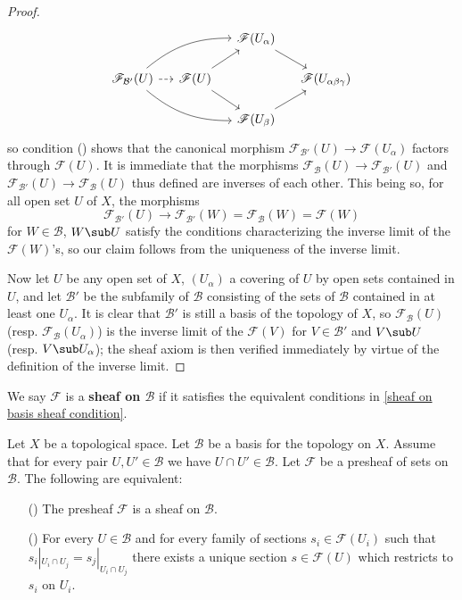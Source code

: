 \begin{proof}
\[\begin{tikzcd}[row sep=15pt,column sep=12pt]
&&\mathscr{F}(U_\alpha)\ar[rd]\\
\mathscr{F}_{\mathcal{B}'}(U)\ar[rru,bend left=20pt]\ar[rrd,bend right=20pt]\ar[r,dashed]&\mathscr{F}(U)\ar[rd]\ar[ru]&&\mathscr{F}(U_{\alpha\beta\gamma})\\
&&\mathscr{F}(U_\beta)\ar[ru]
\end{tikzcd}\]
so condition () shows that the canonical morphism $\mathscr{F}_{\mathcal{B}'}(U)\to\mathscr{F}(U_\alpha)$ factors through $\mathscr{F}(U)$. It is immediate that the morphisms $\mathscr{F}_{\mathcal{B}}(U)\to\mathscr{F}_{\mathcal{B}'}(U)$ and $\mathscr{F}_{\mathcal{B}'}(U)\to\mathscr{F}_{\mathcal{B}}(U)$ thus defined are inverses of each other. This being so, for all open set $U$ of $X$, the morphisms
\[\mathscr{F}_{\mathcal{B}'}(U)\to\mathscr{F}_{\mathcal{B}'}(W)=\mathscr{F}_{\mathcal{B}}(W)=\mathscr{F}(W)\]
for $W\in\mathcal{B}$, $W\sub U$ satisfy the conditions characterizing the inverse limit of the $\mathscr{F}(W)$'s, so our claim follows from the uniqueness of the inverse limit.\par
Now let $U$ be any open set of $X$, $(U_\alpha)$ a covering of $U$ by open sets contained in $U$, and let $\mathcal{B}'$ be the subfamily of $\mathcal{B}$ consisting of the sets of $\mathcal{B}$ contained in at least one $U_\alpha$. It is clear that $\mathcal{B}'$ is still a basis of the topology of $X$, so $\mathscr{F}_{\mathcal{B}}(U)$ (resp. $\mathscr{F}_{\mathcal{B}}(U_\alpha)$) is the inverse limit of the $\mathscr{F}(V)$ for $V\in\mathcal{B}'$ and $V\sub U$ (resp. $V\sub U_\alpha$); the sheaf axiom is then verified immediately by virtue of the definition of the inverse limit.
\end{proof}
We say $\mathscr{F}$ is a \textbf{sheaf on $\mathcal{B}$} if it satisfies the equivalent conditions in \cref{sheaf on basis sheaf condition}.
\begin{corollary}\label{sheaf basis cofinal coro}
Let $X$ be a topological space. Let $\mathcal{B}$ be a basis for the topology on $X$. Assume that for every pair $U,U'\in\mathcal{B}$ we have $U\cap U'\in\mathcal{B}$. Let $\mathscr{F}$ be a presheaf of sets on $\mathcal{B}$. The following are equivalent:
\begin{itemize}
\item[(\rmnum{1})] The presheaf $\mathscr{F}$ is a sheaf on $\mathcal{B}$.
\item[(\rmnum{2})] For every $U\in\mathcal{B}$ and for every family of sections $s_i\in\mathscr{F}(U_i)$ such that $s_{i}|_{U_i\cap U_j}=s_j|_{U_i\cap U_j}$ there exists a unique section $s\in\mathscr{F}(U)$ which restricts to $s_i$ on $U_i$.
\end{itemize}
\end{corollary}
